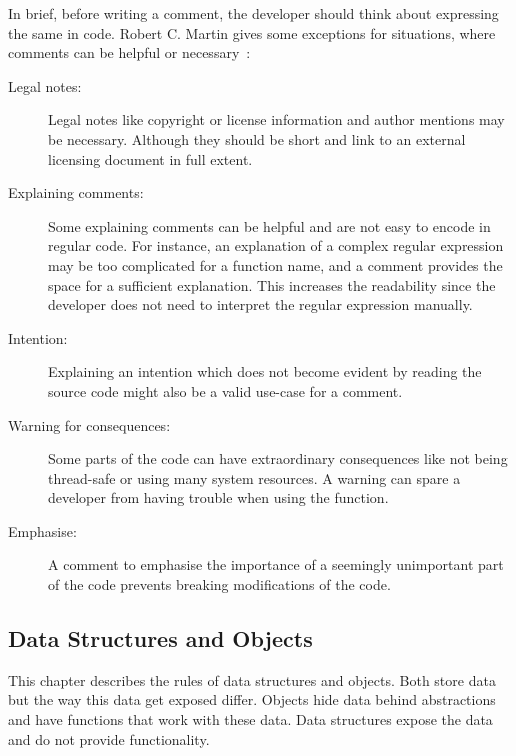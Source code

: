 In brief, before writing a comment, the developer should think about expressing the same in code. Robert C. Martin gives some exceptions for situations, where comments can be helpful or necessary~\cite{martin_clean_2009}:

\begin{description}
    \item[Legal notes:] Legal notes like copyright or license information and author mentions may be necessary. Although they should be short and link to an external licensing document in full extent.
    \item[Explaining comments:] Some explaining comments can be helpful and are not easy to encode in regular code. For instance, an explanation of a complex regular expression may be too complicated for a function name, and a comment provides the space for a sufficient explanation. This increases the readability since the developer does not need to interpret the regular expression manually.
    \item[Intention:] Explaining an intention which does not become evident by reading the source code might also be a valid use-case for a comment. 
    \item[Warning for consequences:] Some parts of the code can have extraordinary consequences like not being thread-safe or using many system resources. A warning can spare a developer from having trouble when using the function.
    \item[Emphasise:] A comment to emphasise the importance of a seemingly unimportant part of the code prevents breaking modifications of the code. 
\end{description}

\subsection{Data Structures and Objects}
This chapter describes the rules of data structures and objects. Both store data but the way this data get exposed differ. Objects hide data behind abstractions and have functions that work with these data. Data structures expose the data and do not provide functionality. 

